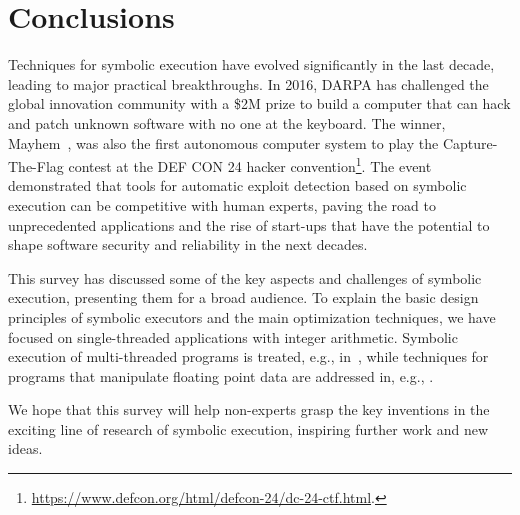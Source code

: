 
\section{Conclusions}
\label{se:conclusions}

Techniques for symbolic execution have evolved significantly in the last decade, leading to major practical breakthroughs. In 2016, DARPA has challenged the global innovation community with a \$2M prize to build a computer that can hack and patch unknown software with no one at the keyboard. The winner, {\sc Mayhem}~\cite{MAYHEM-SP12}, was also the first autonomous computer system to play the Capture-The-Flag contest at the DEF CON 24 hacker convention\footnote{\url{https://www.defcon.org/html/defcon-24/dc-24-ctf.html}.}. The event demonstrated that tools for automatic exploit detection based on symbolic execution can be competitive with human experts, paving the road to unprecedented applications and the rise of start-ups that have the potential to shape software security and reliability in the next decades. 

This survey has discussed some of the key aspects and challenges of symbolic execution, presenting them for a broad audience. To explain the basic design principles of symbolic executors and the main optimization techniques, we have focused on single-threaded applications with integer arithmetic. Symbolic execution of multi-threaded programs is treated, e.g., in~\cite{KPV-TACAS03,SA-HVC06,CLOUD9-EUROSYS11,FHR-ESEC13,BGC-OOPSLA14,GKW-ESEC15}, while techniques for programs that manipulate floating point data are addressed in, e.g., \cite{M-STVR01,BGM-STVR06,LTH-ICTSS10,CCK-EUROSYS11,BVL-POPL13,CCK-TSE14,RPW-SIGSOFT15}.

We hope that this survey will help non-experts grasp the key inventions in the exciting line of research of symbolic execution, inspiring further work and new ideas.
